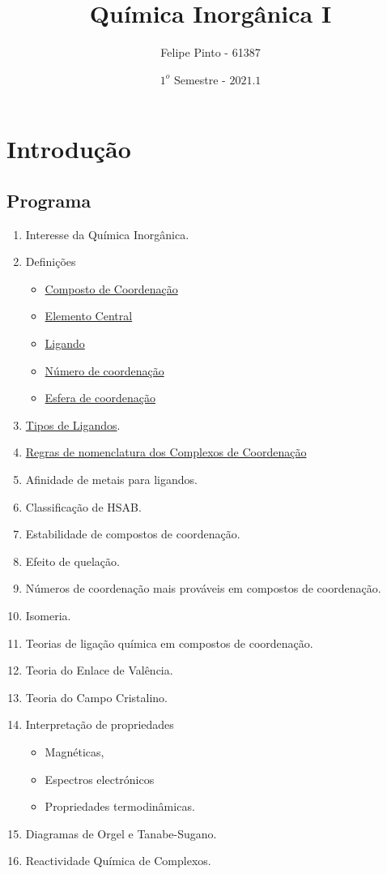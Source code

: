 \documentclass[12pt]{report}
\begin{document}
\title{\bfseries\color{DarkGreen!75!} Química Inorgânica I}
\author{Felipe Pinto - 61387}
\date{$1^o$ Semestre - $2021.1$}

\maketitle
\tableofcontents

\chapter{Introdução}

\section{Programa}
\begin{enumerate}
\item Interesse da Química Inorgânica. 
\item Definições
	\begin{itemize}
 	\item 
		\hyperlink{composto de coordenacao}%
					 {Composto de Coordenação}
	\item \hyperlink{elemento central}{Elemento Central}
	\item \hyperlink{ligando}{Ligando}
	\item 
		\hyperlink{numero de coordenacao}{Número de coordenação}
	\item 
		\hyperlink{esfera de coordenacao}{Esfera de coordenação}
	\end{itemize}
\item \hyperlink{tipos de ligandos}{Tipos de Ligandos}.
\item 
	\hyperlink{nomenclatura complexos de coordenacao}%
	{Regras de nomenclatura dos Complexos de Coordenação}
\item Afinidade de metais para ligandos.
\item Classificação de HSAB.
\item Estabilidade de compostos de coordenação.
\item Efeito de quelação.
\item Números de coordenação mais prováveis em compostos de coordenação.
\item Isomeria.
\item Teorias de ligação química em compostos de coordenação.
\item Teoria do Enlace de Valência.
\item Teoria do Campo Cristalino.
\item Interpretação de propriedades
	\begin{itemize}
	\item Magnéticas, 
	\item Espectros electrónicos 
	\item Propriedades termodinâmicas.
	\end{itemize}
\item Diagramas de Orgel e Tanabe-Sugano.
\item Reactividade Química de Complexos.
\end{enumerate}
\end{document}
